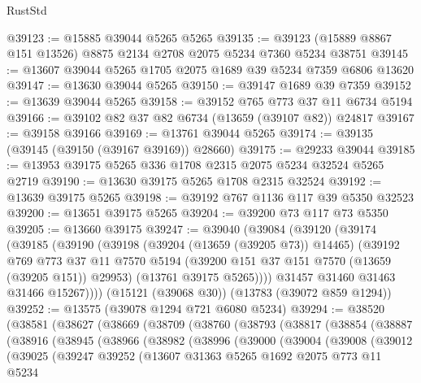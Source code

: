 \begin{lexlean}{RustStd}
\begin{coremodule}
@39123 := @15885 @39044 @5265 @5265
@39135 := @39123 (@15889 @8867 @151 @13526) @8875 @2134 @2708 @2075 @5234 @7360 @5234 @38751
@39145 := @13607 @39044 @5265 @1705 @2075 @1689 @39 @5234 @7359 @6806 @13620
@39147 := @13630 @39044 @5265
@39150 := @39147 @1689 @39 @7359
@39152 := @13639 @39044 @5265
@39158 := @39152 @765 @773 @37 @11 @6734 @5194
@39166 := @39102 @82 @37 @82 @6734 (@13659 (@39107 @82)) @24817
@39167 := @39158 @39166
@39169 := @13761 @39044 @5265
@39174 := @39135 (@39145 (@39150 (@39167 @39169)) @28660)
@39175 := @29233 @39044
@39185 := @13953 @39175 @5265 @336 @1708 @2315 @2075 @5234 @32524 @5265 @2719
@39190 := @13630 @39175 @5265 @1708 @2315 @32524
@39192 := @13639 @39175 @5265
@39198 := @39192 @767 @1136 @117 @39 @5350 @32523
@39200 := @13651 @39175 @5265
@39204 := @39200 @73 @117 @73 @5350
@39205 := @13660 @39175
@39247 := @39040
    (@39084
      (@39120
        (@39174
          (@39185
            (@39190
              (@39198
                (@39204 (@13659 (@39205 @73)) @14465)
                (@39192
                  @769
                  @773
                  @37
                  @11
                  @7570
                  @5194
                  (@39200 @151 @37 @151 @7570 (@13659 (@39205 @151)) @29953)
                  (@13761 @39175 @5265))))
            @31457
            @31460
            @31463
            @31466
            @15267))))
    (@15121 (@39068 @30))
    (@13783 (@39072 @859 @1294))
@39252 := @13575 (@39078 @1294 @721 @6080 @5234)
@39294 := @38520
    (@38581
      (@38627
        (@38669
          (@38709
            (@38760
              (@38793
                (@38817
                  (@38854
                    (@38887
                      (@38916
                        (@38945
                          (@38966
                            (@38982
                              (@38996
                                (@39000
                                  (@39004
                                    (@39008
                                      (@39012
                                        (@39025
                                          (@39247
                                            @39252
                                            (@13607
                                              @31363
                                              @5265
                                              @1692
                                              @2075
                                              @773
                                              @11
                                              @5234

\end{coremodule}
\end{lexlean}
